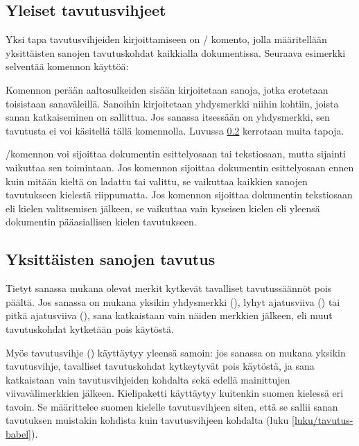 \subsection{Yleiset tavutusvihjeet}

Yksi tapa tavutusvihjeiden kirjoittamiseen on \-/
komento, jolla määritellään yksittäisten sanojen tavutuskohdat
kaikkialla dokumentissa. Seuraava esimerkki selventää komennon käyttöä:

\begin{koodilohkosis}
\end{koodilohkosis}

\noindent
Komennon perään aaltosulkeiden sisään kirjoitetaan sanoja, jotka
erotetaan toisistaan sanaväleillä. Sanoihin kirjoitetaan yhdysmerkki
niihin kohtiin, joista sanan katkaiseminen on sallittua. Jos sanassa
itsessään on yhdysmerkki, sen tavutusta ei voi käsitellä tällä
komennolla. Luvussa \ref{luku/tavutuksen-merkit} kerrotaan muita tapoja.

\-/komennon voi sijoittaa dokumentin esittelyosaan
tai tekstiosaan, mutta sijainti vaikuttaa sen toimintaan. Jos komennon
sijoittaa dokumentin esittelyosaan ennen kuin mitään kieltä on ladattu
tai valittu, se vaikuttaa kaikkien sanojen tavutukseen kielestä
riippumatta. Jos komennon sijoittaa dokumentin tekstiosaan eli kielen
valitsemisen jälkeen, se vaikuttaa vain kyseisen kielen eli yleensä
dokumentin pääasiallisen kielen tavutukseen.

\subsection{Yksittäisten sanojen tavutus}
\label{luku/tavutuksen-merkit}

Tietyt sanassa mukana olevat merkit kytkevät tavalliset tavutussäännöt
pois päältä. Jos sanassa on mukana yksikin yhdysmerkki (\koodi{\=/}),
lyhyt ajatusviiva (\mbox{\koodi{--}}) tai pitkä ajatusviiva
(\mbox{\koodi{---}}), sana katkaistaan vain näiden merkkien jälkeen, eli
muut tavutuskohdat kytketään pois käytöstä.

Myös tavutusvihje (\komento{-}) käyttäytyy yleensä samoin: jos sanassa
on mukana yksikin tavutusvihje, tavalliset tavutuskohdat kytkeytyvät
pois käytöstä, ja sana katkaistaan vain tavutusvihjeiden kohdalta sekä
edellä mainittujen viivavälimerkkien jälkeen. Kielipaketti
 käyttäytyy kuitenkin suomen kielessä eri tavoin. Se
määrittelee suomen kielelle tavutusvihjeen siten, että se sallii sanan
tavutuksen muistakin kohdista kuin tavutusvihjeen kohdalta (luku
\ref{luku/tavutus-babel}).

